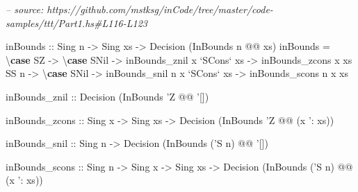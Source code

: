 \documentclass[]{article}
\newenvironment{Shaded}{}{}
\newcommand{\CommentTok}[1]{\textcolor[rgb]{0.38,0.63,0.69}{\textit{#1}}}
\newcommand{\DataTypeTok}[1]{\textcolor[rgb]{0.56,0.13,0.00}{#1}}
\newcommand{\FunctionTok}[1]{\textcolor[rgb]{0.02,0.16,0.49}{#1}}
\newcommand{\KeywordTok}[1]{\textcolor[rgb]{0.00,0.44,0.13}{\textbf{#1}}}
\newcommand{\NormalTok}[1]{#1}
\newcommand{\OtherTok}[1]{\textcolor[rgb]{0.00,0.44,0.13}{#1}}
\begin{document}
\begin{Shaded}
\begin{Highlighting}[]
\CommentTok{-- source: https://github.com/mstksg/inCode/tree/master/code-samples/ttt/Part1.hs#L116-L123}

\OtherTok{inBounds ::} \DataTypeTok{Sing}\NormalTok{ n }\OtherTok{->} \DataTypeTok{Sing}\NormalTok{ xs }\OtherTok{->} \DataTypeTok{Decision}\NormalTok{ (}\DataTypeTok{InBounds}\NormalTok{ n }\FunctionTok{@@}\NormalTok{ xs)}
\NormalTok{inBounds }\FunctionTok{=}\NormalTok{ \textbackslash{}}\KeywordTok{case}
    \DataTypeTok{SZ} \OtherTok{->}\NormalTok{ \textbackslash{}}\KeywordTok{case}
      \DataTypeTok{SNil}         \OtherTok{->}\NormalTok{ inBounds_znil}
\NormalTok{      x }\OtherTok{`SCons`}\NormalTok{ xs }\OtherTok{->}\NormalTok{ inBounds_zcons x xs}
    \DataTypeTok{SS}\NormalTok{ n }\OtherTok{->}\NormalTok{ \textbackslash{}}\KeywordTok{case}
      \DataTypeTok{SNil}         \OtherTok{->}\NormalTok{ inBounds_snil n}
\NormalTok{      x }\OtherTok{`SCons`}\NormalTok{ xs }\OtherTok{->}\NormalTok{ inBounds_scons n x xs}

\OtherTok{inBounds_znil  ::} \DataTypeTok{Decision}\NormalTok{ (}\DataTypeTok{InBounds}\NormalTok{ '}\DataTypeTok{Z} \FunctionTok{@@}\NormalTok{ '[])}

\OtherTok{inBounds_zcons ::} \DataTypeTok{Sing}\NormalTok{ x }\OtherTok{->} \DataTypeTok{Sing}\NormalTok{ xs}
               \OtherTok{->} \DataTypeTok{Decision}\NormalTok{ (}\DataTypeTok{InBounds}\NormalTok{ '}\DataTypeTok{Z} \FunctionTok{@@}\NormalTok{ (x '}\FunctionTok{:}\NormalTok{ xs))}

\OtherTok{inBounds_snil  ::} \DataTypeTok{Sing}\NormalTok{ n}
               \OtherTok{->} \DataTypeTok{Decision}\NormalTok{ (}\DataTypeTok{InBounds}\NormalTok{ ('}\DataTypeTok{S}\NormalTok{ n) }\FunctionTok{@@}\NormalTok{ '[])}

\OtherTok{inBounds_scons ::} \DataTypeTok{Sing}\NormalTok{ n }\OtherTok{->} \DataTypeTok{Sing}\NormalTok{ x }\OtherTok{->} \DataTypeTok{Sing}\NormalTok{ xs}
               \OtherTok{->} \DataTypeTok{Decision}\NormalTok{ (}\DataTypeTok{InBounds}\NormalTok{ ('}\DataTypeTok{S}\NormalTok{ n) }\FunctionTok{@@}\NormalTok{ (x '}\FunctionTok{:}\NormalTok{ xs))}
\end{Highlighting}
\end{Shaded}
\end{document}
